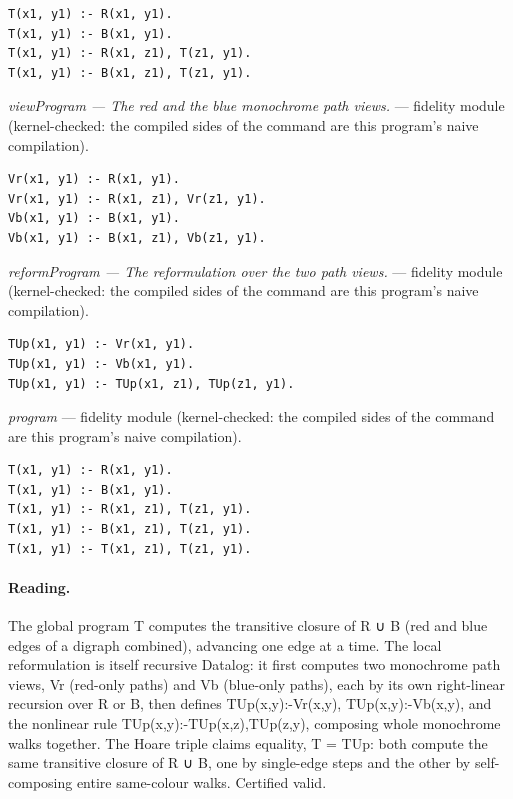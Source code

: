 \documentclass[10pt]{article}
\begin{document}
\begin{Verbatim}[fontsize=\scriptsize,breaklines=true,breakanywhere=true,frame=single,framesep=1.5mm]
T(x1, y1) :- R(x1, y1).
T(x1, y1) :- B(x1, y1).
T(x1, y1) :- R(x1, z1), T(z1, y1).
T(x1, y1) :- B(x1, z1), T(z1, y1).
\end{Verbatim}

{\raggedright\textit{viewProgram --- The red and the blue monochrome path views.} --- fidelity module (kernel-checked: the compiled sides of the command are this program's naive compilation).\par}

\begin{Verbatim}[fontsize=\scriptsize,breaklines=true,breakanywhere=true,frame=single,framesep=1.5mm]
Vr(x1, y1) :- R(x1, y1).
Vr(x1, y1) :- R(x1, z1), Vr(z1, y1).
Vb(x1, y1) :- B(x1, y1).
Vb(x1, y1) :- B(x1, z1), Vb(z1, y1).
\end{Verbatim}

{\raggedright\textit{reformProgram --- The reformulation over the two path views.} --- fidelity module (kernel-checked: the compiled sides of the command are this program's naive compilation).\par}

\begin{Verbatim}[fontsize=\scriptsize,breaklines=true,breakanywhere=true,frame=single,framesep=1.5mm]
TUp(x1, y1) :- Vr(x1, y1).
TUp(x1, y1) :- Vb(x1, y1).
TUp(x1, y1) :- TUp(x1, z1), TUp(z1, y1).
\end{Verbatim}

{\raggedright\textit{program} --- fidelity module (kernel-checked: the compiled sides of the command are this program's naive compilation).\par}

\begin{Verbatim}[fontsize=\scriptsize,breaklines=true,breakanywhere=true,frame=single,framesep=1.5mm]
T(x1, y1) :- R(x1, y1).
T(x1, y1) :- B(x1, y1).
T(x1, y1) :- R(x1, z1), T(z1, y1).
T(x1, y1) :- B(x1, z1), T(z1, y1).
T(x1, y1) :- T(x1, z1), T(z1, y1).
\end{Verbatim}

\paragraph{Reading.} The global program T computes the transitive closure of R ∪ B (red and blue edges of a digraph combined), advancing one edge at a time. The local reformulation is itself recursive Datalog: it first computes two monochrome path views, Vr (red-only paths) and Vb (blue-only paths), each by its own right-linear recursion over R or B, then defines TUp(x,y):-Vr(x,y), TUp(x,y):-Vb(x,y), and the nonlinear rule TUp(x,y):-TUp(x,z),TUp(z,y), composing whole monochrome walks together. The Hoare triple claims equality, T = TUp: both compute the same transitive closure of R ∪ B, one by single-edge steps and the other by self-composing entire same-colour walks. Certified valid.
\end{document}
